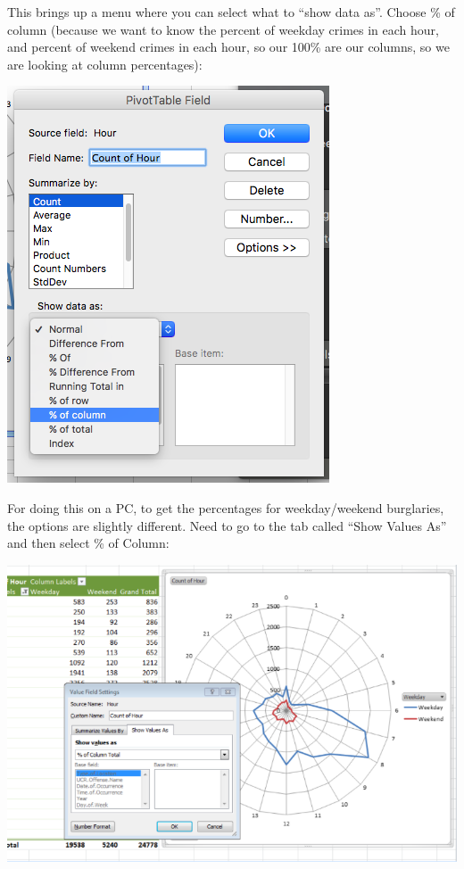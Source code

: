 \documentclass[
]{book}
\begin{document}
This brings up a menu where you can select what to ``show data as''. Choose \% of column (because we want to know the percent of weekday crimes in each hour, and percent of weekend crimes in each hour, so our 100\% are our columns, so we are looking at column percentages):

\includegraphics{imgs/hr_r_27.png}

For doing this on a PC, to get the percentages for weekday/weekend burglaries, the options are slightly different. Need to go to the tab called ``Show Values As'' and then select \% of Column:

\includegraphics{imgs/pc_radial.png}
\end{document}
